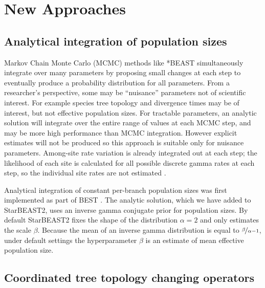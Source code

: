 \documentclass[nogrid]{MBE}%
\begin{document}
\section{New Approaches}

\subsection{Analytical integration of population sizes}

Markov Chain Monte Carlo (MCMC) methods like *BEAST simultaneously integrate
over many parameters by proposing small changes at each step to eventually
produce a probability distribution for all parameters. From a
researcher's perspective, some may be ``nuisance'' parameters not of scientific
interest. For example species tree topology and divergence times may be of
interest, but not effective population sizes. For tractable parameters, an
analytic solution will integrate over the entire range of values at each MCMC
step, and may be more high performance than MCMC integration. However explicit
estimates will not be produced so this approach is suitable only for nuisance
parameters. Among-site rate variation is already integrated out at each step;
the likelihood of each site is calculated for all possible discrete gamma rates
at each step, so the individual site rates are not estimated \citep{Yang1994}.

Analytical integration of constant per-branch population sizes was first
implemented as part of BEST \citep{EVO:EVO414}. The analytic solution, which
we have added to StarBEAST2, uses an inverse gamma conjugate prior for
population sizes. By default StarBEAST2 fixes the shape of the distribution
$\alpha = 2$ and only estimates the scale $\beta$. Because the mean of an
inverse gamma distribution is equal to $\nicefrac{\beta}{\alpha - 1}$, under default
settings the hyperparameter $\beta$ is an estimate of mean effective
population size.

\subsection{Coordinated tree topology changing operators}
\end{document}
